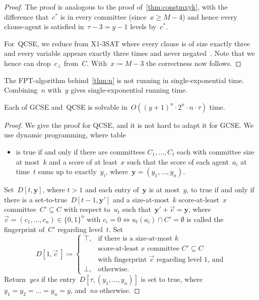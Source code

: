 \documentclass[10pt,a4paper,twocolumn]{article}
\theoremstyle{plain}
\theoremstyle{definition}
\theoremstyle{remark}
\newcommand{\prob}[1]{\textnormal{\textsc{#1}}}
\newcommand{\yes}{\emph{yes}}
\newcommand{\no}{\emph{no}}
\newcommand{\ceq}{\coloneqq}
\newcommand{\false}{\bot}
\newcommand{\true}{\top}
\newcommand{\smlaAcr}{\prob{GCSE}}
\newcommand{\fmlaAcr}{\prob{QCSE}}
\newcommand{\xOTsatAcr}{\prob{X1-3SAT}}
\begin{document}
{{  \begin{proof}
    The proof is analogous to the proof of~\cref{thm:constmxyk},
    with the difference that~$c^*$ is in every committee 
    (since~$x\geq M-4$)
    and hence every clause-agent is satisfied in~$\tau-3=y-1$ levels by~$c^*$.
    
    For~\fmlaAcr{},
    we reduce from \xOTsatAcr{} where every clause is of size exactly three and every variable appears exactly three times and never negated~\cite[Theorem~29]{Schmidt2010d}.
    Note that we hence can drop~$c_\false$ from~$C$.
    With~$x\ceq M-3$ the correctness now follows.
  \end{proof}
}

%
The FPT-algorithm behind~\cref{thm:n}
is not running in single-exponential time.
Combining~$n$ with~$y$ gives 
single-exponential running time.

\begin{theorem}%
  \label{thm:ny}
 Each of \smlaAcr{} and~\fmlaAcr{}
 is solvable in~$O((y+1)^n\cdot 2^n\cdot n\cdot \tau)$ time.
\end{theorem}

%
{
  \begin{proof}
  We give the proof for \fmlaAcr{},
  and it is not hard to adapt it for \smlaAcr{}.
  We use dynamic programming,
  where table
  
  \begin{itemize}
    \item[{$D[t,\mathbf{y}]$}] is true if and only if there are committees
      $C_1,\dots,C_t$ each with committee size at most~$k$ and a score of at least~$x$ such that the score of each agent~$a_i$ at time~$t$ sums up to exactly~$y_i$, 
      where~$\mathbf{y}=(y_1,\dots,y_n)$.
  \end{itemize}
  
  Set~$D[t,\mathbf{y}]$,
  where $t>1$ and each entry of~$\mathbf{y}$ is at most~$y$,
  to true if and only if 
  there is a set-to-true~$D[t-1,\mathbf{y'}]$ 
  and a size-at-most~$k$ score-at-least~$x$ committee~$C'\subseteq C$ with respect to~$u_t$
  such that~$\mathbf{y'}+\vec{c}=\mathbf{y}$,
  where~$\vec{c}=(c_1,\dots,c_n)\in\{0,1\}^n$ with
%
    $c_i = 0 \iff u_t(a_i)\cap C'=\emptyset$
%
  is called the fingerprint of~$C'$ regarding level~$t$.
  Set
  \[ D[1,\vec{c}~] \ceq \begin{cases} \true, & \text{if there is a size-at-most~$k$} \\ & \text{score-at-least~$x$ committee~$C'\subseteq C$} \\ & \text{with fingerprint~$\vec{c}$ regarding level~$1$, and} \\
  \false,& \text{otherwise}.
  \end{cases} \]
  Return~\yes{}
  if the entry~$D[\tau,(y_1,\dots,y_n)]$ is set to true,
  where~$y_1=y_2=\dots=y_n=y$,
  and~\no{} otherwise.
  

\end{proof}}}
\end{document}
